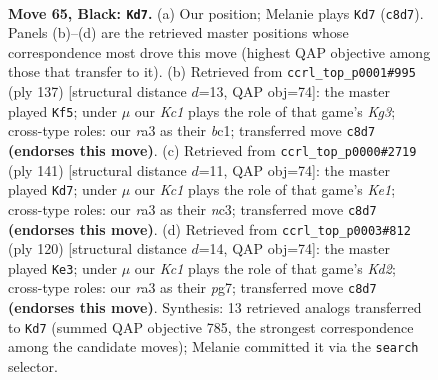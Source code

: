 \documentclass[11pt]{article}
\begin{document}
\clearpage

\begin{figure}[p]\centering
\begin{subfigure}{0.46\textwidth}\centering
\resizebox{\linewidth}{!}{%
\newchessgame
\chessboard[
  setfen={2k3R1/1b6/8/8/1P6/R7/1r6/6K1 b - - 4 65},
  showmover=false,
  pgfstyle=straightmove, color=movearrow, markmove={c8-d7}
]}
\caption{}
\end{subfigure}\hfill
\begin{subfigure}{0.46\textwidth}\centering
\resizebox{\linewidth}{!}{%
\newchessgame
\chessboard[
  setfen={8/8/2R3k1/7b/4r3/6K1/8/2B5 b - - 15 69},
  showmover=false,
  pgfstyle=straightmove, color=movearrow, markmove={g6-f5}
]}
\caption{}
\end{subfigure}
\\[4pt]
\begin{subfigure}{0.46\textwidth}\centering
\resizebox{\linewidth}{!}{%
\newchessgame
\chessboard[
  setfen={R3k3/5b2/8/6K1/7P/2N5/8/7r b - - 28 71},
  showmover=false,
  pgfstyle=straightmove, color=movearrow, markmove={e8-d7}
]}
\caption{}
\end{subfigure}\hfill
\begin{subfigure}{0.46\textwidth}\centering
\resizebox{\linewidth}{!}{%
\newchessgame
\chessboard[
  setfen={8/6pk/8/1R6/7p/2B5/3K3r/8 w - - 4 61},
  showmover=false,
  pgfstyle=straightmove, color=movearrow, markmove={d2-e3}
]}
\caption{}
\end{subfigure}
\caption{\textbf{Move 65, Black: \texttt{Kd7}.} (a) Our position; Melanie plays \texttt{Kd7} (\texttt{c8d7}). Panels (b)--(d) are the retrieved master positions whose correspondence most drove this move (highest QAP objective among those that transfer to it). (b) Retrieved from \texttt{ccrl\_top\_p0001\#995} (ply 137) [structural distance $d$=13, QAP obj=74]: the master played \texttt{Kf5}; under $\mu$ our \emph{Kc1} plays the role of that game's \emph{Kg3}; cross-type roles: our \emph{r}a3 as their \emph{b}c1; transferred move \texttt{c8d7} \textbf{(endorses this move)}. (c) Retrieved from \texttt{ccrl\_top\_p0000\#2719} (ply 141) [structural distance $d$=11, QAP obj=74]: the master played \texttt{Kd7}; under $\mu$ our \emph{Kc1} plays the role of that game's \emph{Ke1}; cross-type roles: our \emph{r}a3 as their \emph{n}c3; transferred move \texttt{c8d7} \textbf{(endorses this move)}. (d) Retrieved from \texttt{ccrl\_top\_p0003\#812} (ply 120) [structural distance $d$=14, QAP obj=74]: the master played \texttt{Ke3}; under $\mu$ our \emph{Kc1} plays the role of that game's \emph{Kd2}; cross-type roles: our \emph{r}a3 as their \emph{p}g7; transferred move \texttt{c8d7} \textbf{(endorses this move)}. Synthesis: 13 retrieved analogs transferred to \texttt{Kd7} (summed QAP objective 785, the strongest correspondence among the candidate moves); Melanie committed it via the \texttt{search} selector.}
\label{fig:thought-m129}
\end{figure}
\end{document}
